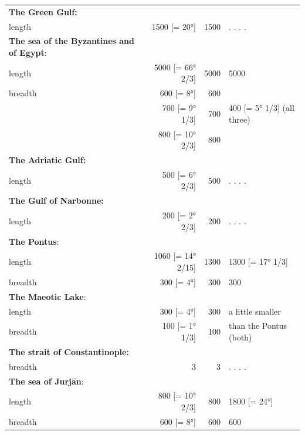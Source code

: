 \documentclass[11pt]{article}
\begin{document}
\begin{center}
\begin{tabular}{p{50mm}rrl}
\textbf{The Green Gulf:} &  &  &  \\
length & 1500 [= 20°] & 1500 & . . . . \\
\textbf{The sea of the Byzantines and of Egypt}\footnotemark{}: &  &  &  \\
length & 5000 [= 66° 2/3] & 5000 & 5000 \\
breadth & 600 [= 8°] & 600 &  \\
 & 700 [= 9° 1/3] & 700 & 400 [= 5° 1/3] (all three) \\
 & 800 [= 10° 2/3] & 800 &  \\
\textbf{The Adriatic Gulf:} &  &  &  \\
length & 500 [= 6° 2/3] & 500 & . . . . \\
\textbf{The Gulf of Narbonne:} &  &  &  \\
length & 200 [= 2° 2/3] & 200 & . . . . \\
\textbf{The Pontus}\footnotemark{}: &  &  &  \\
length & 1060 [= 14° 2/15] & 1300 & 1300 [= 17° 1/3] \\
breadth & 300 [= 4°] & 300 & 300 \\
\textbf{The Maeotic Lake}\footnotemark{}: &  &  &  \\
length & 300 [= 4°] & 300 & a little smaller \\
breadth & 100 [= 1° 1/3] & 100 & than the Pontus (both) \\
\textbf{The strait of Constantinople:} &  &  &  \\
breadth & 3 & 3 & . . . . \\
\textbf{The sea of Jurjān}\footnotemark{}: &  &  &  \\
length & 800 [= 10° 2/3] & 800 & 1800 [= 24°] \\
breadth & 600 [= 8°] & 600 & 600 \\
\end{tabular}\end{center}
\end{document}
